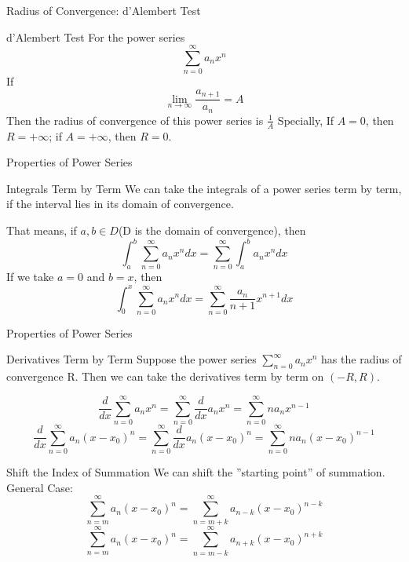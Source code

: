 \begin{frame}{Radius of Convergence: d’Alembert Test}
    \begin{block}{d’Alembert Test}
        For the power series
        $$\sum\limits_{n=0}^{\infty}a_n x^n$$
        If $$\mathop{lim}\limits_{n\rightarrow \infty} \frac{a_{n+1}}{a_n}=A$$
        Then the radius of convergence of this power series is $\frac{1}{A}$
        Specially, If $A = 0$, then $R = +\infty$; if $A = +\infty$, then $R = 0$.
    \end{block}
\end{frame}


\begin{frame}{Properties of Power Series}
    \begin{block}{Integrals Term by Term}
        We can take the integrals of a power series term by term, if the interval lies in its domain of convergence.
    \end{block}
    That means, if $a,b \in D $(D is the domain of convergence), then
    $$\int_a^b \sum\limits_{n=0}^{\infty} a_n x^n dx=\sum\limits_{n=0}^{\infty}\int_a^b a_n x^n dx$$
    If we take $a = 0$ and $b = x$, then
    $$\int_0^x \sum\limits_{n=0}^{\infty} a_n x^n dx=\sum\limits_{n=0}^{\infty}\frac {a_n}{n+1} x^{n+1} dx$$
\end{frame}


\begin{frame}{Properties of Power Series}
    \begin{block}{ Derivatives Term by Term}
        Suppose the power series $\sum_{n=0}^{\infty}a_n x^n$ has the radius of convergence R. Then we can take the derivatives term by term on $(-R,R)$.
    \end{block}
    $$\frac{d}{dx}\sum\limits_{n=0}^{\infty}a_n x^n = \sum\limits_{n=0}^{\infty} \frac{d}{dx} a_n x^n = \sum\limits_{n=0}^{\infty} n a_n x^{n-1}$$
    $$\frac{d}{dx}\sum\limits_{n=0}^{\infty}a_n (x-x_0)^n = \sum\limits_{n=0}^{\infty} \frac{d}{dx} a_n (x-x_0)^n = \sum\limits_{n=0}^{\infty} n a_n (x-x_0)^{n-1}$$
\end{frame}


\begin{frame}{Shift the Index of Summation}
    We can shift the ”starting point” of summation. General Case:
    $$\sum\limits_{n=m}^{\infty} a_n (x-x_0)^n = \sum\limits_{n=m+k}^{\infty} a_{n-k} (x-x_0)^{n-k}$$
    $$\sum\limits_{n=m}^{\infty} a_n (x-x_0)^n = \sum\limits_{n=m-k}^{\infty} a_{n+k} (x-x_0)^{n+k}$$
\end{frame}


